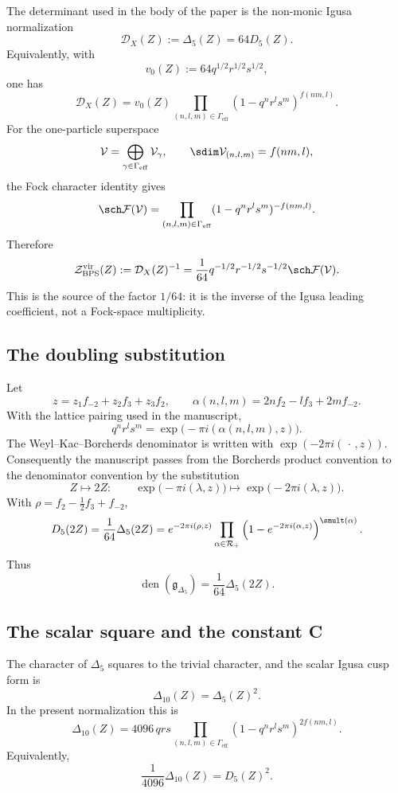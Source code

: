 The determinant used in the body of the paper is the non-monic Igusa
normalization
$$
\mathcal D_X(Z):=\Delta_5(Z)
=64D_5(Z).
$$
Equivalently, with
$$
v_0(Z):=64q^{1/2}r^{1/2}s^{1/2},
$$
one has
$$
\mathcal D_X(Z)
=v_0(Z)
\prod_{(n,l,m)\in\Gamma_{\mathrm{eff}}}
(1-q^nr^ls^m)^{f(nm,l)}.
$$
For the one-particle superspace
$$
\mathcal V=\bigoplus_{\gamma\in\Gamma_{\mathrm{eff}}}\mathcal V_\gamma,
\qquad
\sdim\mathcal V_{(n,l,m)}=f(nm,l),
$$
the Fock character identity gives
$$
\sch\mathcal F(\mathcal V)
=\prod_{(n,l,m)\in\Gamma_{\mathrm{eff}}}
(1-q^nr^ls^m)^{-f(nm,l)}.
$$
Therefore
$$
\mathcal Z_{\mathrm{BPS}}^{\mathrm{vir}}(Z)
:=\mathcal D_X(Z)^{-1}
=\frac1{64}q^{-1/2}r^{-1/2}s^{-1/2}\sch\mathcal F(\mathcal V).
$$
This is the source of the factor $1/64$: it is the inverse of the Igusa
leading coefficient, not a Fock-space multiplicity.

\subsection{The doubling substitution}

Let
$$
z=z_1f_{-2}+z_2f_3+z_3f_2,
\qquad
\alpha(n,l,m)=2nf_2-lf_3+2mf_{-2}.
$$
With the lattice pairing used in the manuscript,
$$
q^nr^ls^m=\exp\bigl(-\pi i(\alpha(n,l,m),z)\bigr).
$$
The Weyl--Kac--Borcherds denominator is written with
$\exp(-2\pi i(\,\cdot\,,z))$.  Consequently the manuscript passes from
the Borcherds product convention to the denominator convention by the
substitution
$$
Z\longmapsto2Z:
\qquad
\exp\bigl(-\pi i(\lambda,z)\bigr)
\longmapsto
\exp\bigl(-2\pi i(\lambda,z)\bigr).
$$
With $\rho=f_2-\frac12f_3+f_{-2}$,
$$
D_5(2Z)
=\frac1{64}\Delta_5(2Z)
=e^{-2\pi i(\rho,z)}
\prod_{\alpha\in\mathcal R_+}
\left(1-e^{-2\pi i(\alpha,z)}\right)^{\smult(\alpha)}.
$$
Thus
$$
\operatorname{den}(\mathfrak g_{\Delta_5})
=\frac1{64}\Delta_5(2Z).
$$

\subsection{The scalar square and the constant C}

The character of $\Delta_5$ squares to the trivial character, and the
scalar Igusa cusp form is
$$
\Delta_{10}(Z)=\Delta_5(Z)^2.
$$
In the present normalization this is
$$
\Delta_{10}(Z)
=4096\,qrs
\prod_{(n,l,m)\in\Gamma_{\mathrm{eff}}}
(1-q^nr^ls^m)^{2f(nm,l)}.
$$
Equivalently,
$$
\frac1{4096}\Delta_{10}(Z)=D_5(Z)^2.
$$

